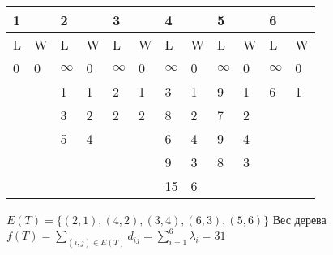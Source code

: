 \documentclass[12pt]{article}
\begin{document}
\begin{table}[!h]
\begin{tabular}{|l|l|l|l|l|l|l|l|l|l|l|l|}
\hline
\multicolumn{2}{|l|}{1}                 & \multicolumn{2}{l|}{2}                 & \multicolumn{2}{l|}{3}                 & \multicolumn{2}{l|}{4}                 & \multicolumn{2}{l|}{5} & \multicolumn{2}{l|}{6} \\ \hline
L                  & W                  & L                  & W                 & L                  & W                 & L                  & W                 & L          & W         & L          & W         \\ \hline
0                  & 0                  & $\infty$                  & 0                 & $\infty$                  & 0                 & $\infty$                  & 0                 & $\infty$          & 0         & $\infty$          & 0         \\ \hline
\multicolumn{2}{|l|}{\multirow{5}{*}{}} & 1                  & 1                 & 2                  & 1                 & 3                  & 1                 & 9          & 1         & 6          & 1         \\ \cline{3-12} 
\multicolumn{2}{|l|}{}                  & \multicolumn{2}{l|}{\multirow{4}{*}{}} & 3                  & 2                 & 2                  & 2                 & 8          & 2         & 7          & 2         \\ \cline{5-12} 
\multicolumn{2}{|l|}{}                  & \multicolumn{2}{l|}{}                  & 5                  & 4                 & \multicolumn{2}{l|}{\multirow{3}{*}{}} & 6          & 4         & 9          & 4         \\ \cline{5-6} \cline{9-12} 
\multicolumn{2}{|l|}{}                  & \multicolumn{2}{l|}{}                  & \multicolumn{2}{l|}{\multirow{2}{*}{}} & \multicolumn{2}{l|}{}                  & 9          & 3         & 8          & 3         \\ \cline{9-12} 
\multicolumn{2}{|l|}{}                  & \multicolumn{2}{l|}{}                  & \multicolumn{2}{l|}{}                  & \multicolumn{2}{l|}{}                  & 15         & 6         & \multicolumn{2}{l|}{}  \\ \hline
\end{tabular}
\end{table}





	$E(T) = \{(2, 1), (4, 2), (3, 4), (6, 3), (5, 6)\}$
	Вес дерева 
	$f(T) = \sum\limits_{(i, j) \in E(T)} d_{ij} = \sum\limits_{i = 1}^6 \lambda_{i} = 31$ \\ \\
	
\end{document}
